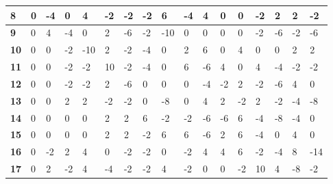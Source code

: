 \begin{longtable}[c]{|l|l|l|l|l|l|l|l|l|l|l|l|l|l|l|l|l|}
\textbf{8}  & 0          & -4         & 0          & 4          & -2         & -2         & -2         & 6          & -4         & 4          & 0           & 0           & -2          & 2           & 2           & -2          \\ \hline
\textbf{9}  & 0          & 4          & -4         & 0          & 2          & -6         & -2         & -10        & 0          & 0          & 0           & 0           & -2          & -6          & -2          & -6          \\ \hline
\textbf{10} & 0          & 0          & -2         & -10        & 2          & -2         & -4         & 0          & 2          & 6          & 0           & 4           & 0           & 0           & 2           & 2           \\ \hline
\textbf{11} & 0          & 0          & -2         & -2         & 10         & -2         & -4         & 0          & 6          & -6         & 4           & 0           & 4           & -4          & -2          & -2          \\ \hline
\textbf{12} & 0          & 0          & -2         & -2         & 2          & -6         & 0          & 0          & 0          & -4         & -2          & 2           & -2          & -6          & 4           & 0           \\ \hline
\textbf{13} & 0          & 0          & 2          & 2          & -2         & -2         & 0          & -8         & 0          & 4          & 2           & -2          & 2           & -2          & -4          & -8          \\ \hline
\textbf{14} & 0          & 0          & 0          & 0          & 2          & 2          & 6          & -2         & -2         & -6         & -6          & 6           & -4          & -8          & -4          & 0           \\ \hline
\textbf{15} & 0          & 0          & 0          & 0          & 2          & 2          & -2         & 6          & 6          & -6         & 2           & 6           & -4          & 0           & 4           & 0           \\ \hline
\textbf{16} & 0          & -2         & 2          & 4          & 0          & -2         & -2         & 0          & -2         & 4          & 4           & 6           & -2          & -4          & 8           & -14         \\ \hline
\textbf{17} & 0          & 2          & -2         & 4          & -4         & -2         & -2         & 4          & -2         & 0          & 0           & -2          & 10          & 4           & -8          & -2          \\ \hline

\end{longtable}
